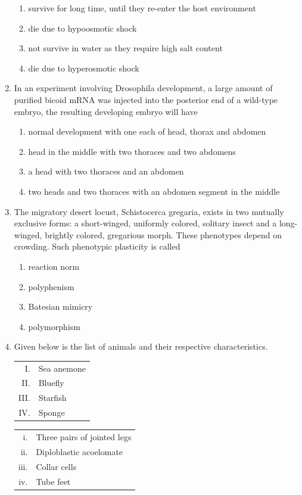 \documentclass[journal,12pt,onecolumn]{IEEEtran}
\begin{document}
\begin{enumerate}[label=\arabic*.,resume]
\begin{enumerate}[label=(\Alph*)]
\item survive for long time, until they re-enter the host environment
\item die due to hypoosmotic shock
\item not survive in water as they require high salt content
\item die due to hyperosmotic shock
\end{enumerate}

\item In an experiment involving Drosophila development, a large amount of purified bicoid mRNA was injected into the posterior end of a wild-type embryo, the resulting developing embryo will have

\begin{enumerate}[label=(\Alph*)]
\item normal development with one each of head, thorax and abdomen
\item head in the middle with two thoraces and two abdomens
\item a head with two thoraces and an abdomen
\item two heads and two thoraces with an abdomen segment in the middle
\end{enumerate}

\item The migratory desert locust, Schistocerca gregaria, exists in two mutually exclusive forms: a short-winged, uniformly colored, solitary insect and a long-winged, brightly colored, gregarious morph. These phenotypes depend on crowding. Such phenotypic plasticity is called

\begin{multicols}{4}
\begin{enumerate}[label=(\Alph*)]
\item reaction norm
\item polyphenism
\item Batesian mimicry
\item polymorphism
\end{enumerate}
\end{multicols}

\item Given below is the list of animals and their respective characteristics.

\begin{tabular}{rl}
I. & Sea anemone \\
II. & Bluefly \\
III. & Starfish \\
IV. & Sponge
\end{tabular}
\quad
\begin{tabular}{rl}
i. & Three pairs of jointed legs \\
ii. & Diploblastic acoelomate \\
iii. & Collar cells \\
iv. & Tube feet
\end{tabular}


\end{enumerate}
\end{document}
